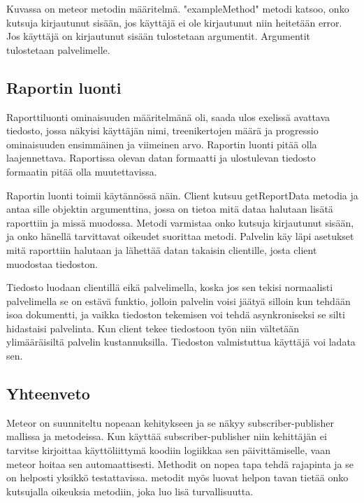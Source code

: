 Kuvassa on meteor metodin määritelmä. "exampleMethod"{} metodi katsoo, onko kutsuja kirjautunut sisään, jos käyttäjä ei ole kirjautunut niin heitetään error.
Jos käyttäjä on kirjautunut sisään tulostetaan argumentit. Argumentit tulostetaan palvelimelle.  





\subsection*{Raportin luonti}


Raporttiluonti ominaisuuden määritelmänä oli, saada ulos exelissä avattava tiedosto, jossa näkyisi käyttäjän nimi, treenikertojen määrä ja progressio ominaisuuden ensimmäinen ja viimeinen arvo.
Raportin luonti pitää olla laajennettava. Raportissa olevan datan formaatti ja ulostulevan tiedosto formaatin pitää olla muutettavissa.
\medskip



Raportin luonti toimii käytännössä näin.
Client kutsuu getReportData metodia ja antaa sille objektin argumenttina, jossa on tietoa mitä dataa halutaan lisätä raporttiin ja missä muodossa.
Metodi varmistaa onko kutsuja kirjautunut sisään, ja onko hänellä tarvittavat oikeudet suorittaa metodi.
Palvelin käy läpi asetukset mitä raporttiin halutaan ja lähettää datan takaisin clientille, josta client muodostaa tiedoston.
\medskip


Tiedosto luodaan clientillä eikä palvelimella, koska jos sen tekisi normaalisti palvelimella se on estävä funktio,
jolloin palvelin voisi jäätyä silloin kun tehdään isoa dokumentti, ja 
vaikka tiedoston tekemisen voi tehdä asynkroniseksi se silti hidastaisi palvelinta. 
Kun client tekee tiedostoon työn niin vältetään ylimääräisiltä palvelin kustannuksilla.
Tiedoston valmistuttua käyttäjä voi ladata sen.
\medskip


\subsection*{Yhteenveto}

Meteor on suunniteltu nopeaan kehitykseen ja se näkyy subscriber-publisher mallissa ja metodeissa.
Kun käyttää subscriber-publisher niin kehittäjän ei tarvitse kirjoittaa käyttöliittymä koodiin logiikkaa sen päivittämiselle, vaan meteor hoitaa sen automaattisesti.
Methodit on nopea tapa tehdä rajapinta ja se on helposti yksikkö testattavissa. metodit myös luovat helpon tavan tietää onko kutsujalla oikeuksia metodiin, joka luo lisä turvallisuutta.
\medskip

